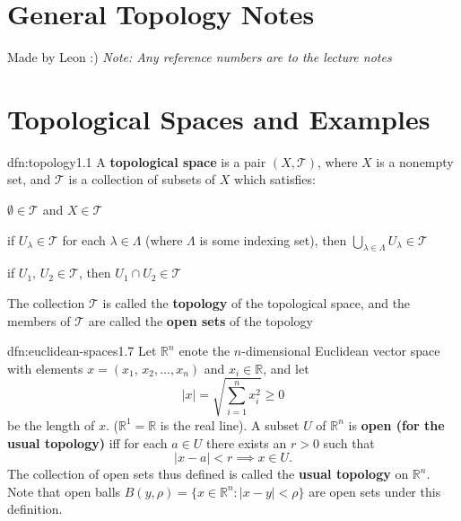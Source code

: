 \documentclass[landscape, 8pt]{extarticle}
\begin{document}
\setlength{\abovedisplayskip}{3.5pt}
\setlength{\belowdisplayskip}{3.5pt}
\setlength{\abovedisplayshortskip}{3.5pt}
\setlength{\belowdisplayshortskip}{3.5pt}

\begin{multicols}{3}
\raggedcolumns


\section*{\huge General Topology Notes}
Made by Leon :) \textit{Note: Any reference numbers are to the lecture notes}

\section{Topological Spaces and Examples}

\begin{dfn}{dfn:topology}{1.1}
A \textbf{topological space} is a pair $(X, \mathcal{T})$, where $X$ is a nonempty set, and $\mathcal{T}$ is a collection of subsets of $X$ which satisfies:
\begin{enumerate-a-tight}
\item $\emptyset \in \mathcal{T}$ and $X \in \mathcal{T}$
\item if $U_{\lambda}\in \mathcal{T}$ for each $\lambda\in \Lambda$ (where $\Lambda$ is some indexing set), then $\bigcup_{\lambda\in \Lambda} U_{\lambda} \in \mathcal{T}$
\item if $U_{1},\,U_{2}\in \mathcal{T}$, then $U_{1} \cap U_{2} \in \mathcal{T}$
\end{enumerate-a-tight}
The collection $\mathcal{T}$ is called the \textbf{topology} of the topological space, and the members of $\mathcal{T}$ are called the \textbf{open sets} of the topology
\end{dfn}

\begin{xmp}{dfn:euclidean-spaces}{1.7}
	Let $\mathbb{R}^{n}$ enote the $n$-dimensional Euclidean vector space with elements $x = (x_{1},\,x_{2},\dots,x_{n})$ and $x_{i}\in\mathbb{R}$, and let
	\[\lvert x \rvert = \sqrt{\sum_{i = 1}^{n} x_{i}^{2}} \ge 0\]
	be the length of $x$. ($\mathbb{R}^{1} = \mathbb{R}$ is the real line). A subset $U$ of $\mathbb{R}^{n}$ is \textbf{open (for the usual topology)} iff for each $a\in U$ there exists an $r > 0$ such that
	\[\lvert x - a \rvert < r \implies x \in U.\]
	The collection of open sets thus defined is called the \textbf{usual topology} on $\mathbb{R}^{n}$. Note that open balls $B(y, \rho) = \{x\in \mathbb{R}^{n} : \lvert x - y \rvert < \rho\}$ are open sets under this definition.
\end{xmp}



\end{multicols}
\end{document}
